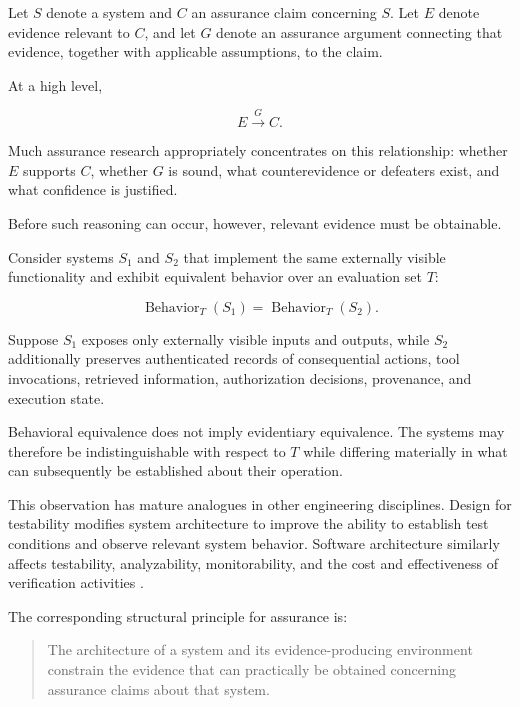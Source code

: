 Let \(S\) denote a system and \(C\) an assurance claim concerning \(S\).
Let \(E\) denote evidence relevant to \(C\), and let \(G\) denote an
assurance argument connecting that evidence, together with applicable
assumptions, to the claim.

At a high level,

\begin{equation}
  E \xrightarrow{G} C.
  \label{eq:evidence-claim}
\end{equation}

Much assurance research appropriately concentrates on this relationship:
whether \(E\) supports \(C\), whether \(G\) is sound, what counterevidence
or defeaters exist, and what confidence is justified.

Before such reasoning can occur, however, relevant evidence must be obtainable.

Consider systems \(S_1\) and \(S_2\) that implement the same externally
visible functionality and exhibit equivalent behavior over an evaluation
set \(T\):

\begin{equation}
  \operatorname{Behavior}_{T}(S_1)
  =
  \operatorname{Behavior}_{T}(S_2).
  \label{eq:behavior-equivalence}
\end{equation}

Suppose \(S_1\) exposes only externally visible inputs and outputs,
while \(S_2\) additionally preserves authenticated records of
consequential actions, tool invocations, retrieved information,
authorization decisions, provenance, and execution state.

Behavioral equivalence does not imply evidentiary equivalence.
The systems may therefore be indistinguishable with respect to \(T\)
while differing materially in what can subsequently be established
about their operation.

This observation has mature analogues in other engineering disciplines.
Design for testability modifies system architecture to improve the ability
to establish test conditions and observe relevant system behavior.
Software architecture similarly affects testability, analyzability,
monitorability, and the cost and effectiveness of verification activities
\cite{abramovici1990digitaltesting,bass2021softwarearchitecture}.

The corresponding structural principle for assurance is:

\begin{quote}
  The architecture of a system and its evidence-producing environment
  constrain the evidence that can practically be obtained concerning
  assurance claims about that system.
\end{quote}

